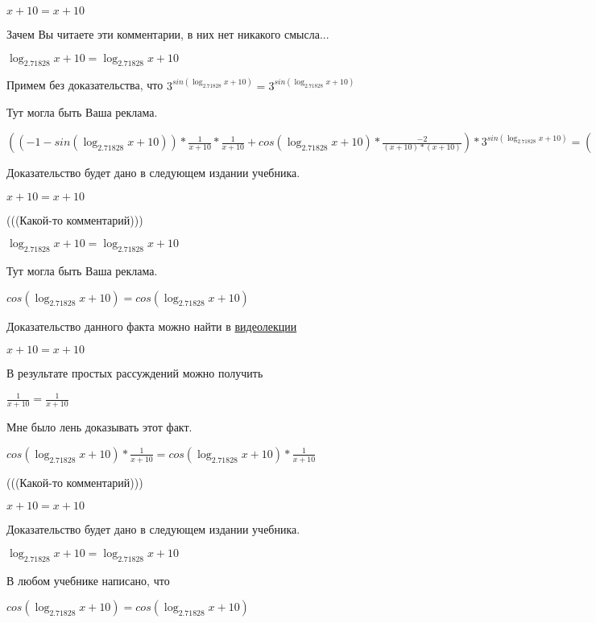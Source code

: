 \documentclass[12pt,a4paper,fleqn]{article}
\theoremstyle{definition}
\begin{document}
$ x  +  10  =  x  +  10 $

Зачем Вы читаете эти комментарии, в них нет никакого смысла...

$\log_{ 2.71828 }{ x  +  10 } = \log_{ 2.71828 }{ x  +  10 }$

Примем без доказательства, что
${ 3 }^{sin(\log_{ 2.71828 }{ x  +  10 })} = { 3 }^{sin(\log_{ 2.71828 }{ x  +  10 })}$

Тут могла быть Ваша реклама.

$(( -1  - sin(\log_{ 2.71828 }{ x  +  10 })) * \frac{ 1 }{ x  +  10 }
 * \frac{ 1 }{ x  +  10 }
 + cos(\log_{ 2.71828 }{ x  +  10 }) * \frac{ -2 }{( x  +  10 ) * ( x  +  10 )}
) * { 3 }^{sin(\log_{ 2.71828 }{ x  +  10 })} = (( -1  - sin(\log_{ 2.71828 }{ x  +  10 })) * \frac{ 1 }{ x  +  10 }
 * \frac{ 1 }{ x  +  10 }
 + cos(\log_{ 2.71828 }{ x  +  10 }) * \frac{ -2 }{( x  +  10 ) * ( x  +  10 )}
) * { 3 }^{sin(\log_{ 2.71828 }{ x  +  10 })}$

Доказательство будет дано в следующем издании учебника.

$ x  +  10  =  x  +  10 $

(((Какой-то комментарий)))

$\log_{ 2.71828 }{ x  +  10 } = \log_{ 2.71828 }{ x  +  10 }$

Тут могла быть Ваша реклама.

$cos(\log_{ 2.71828 }{ x  +  10 }) = cos(\log_{ 2.71828 }{ x  +  10 })$

Доказательство данного факта можно найти в \href{https://www.youtube.com/watch?v=dQw4w9WgXcQ}{видеолекции}

$ x  +  10  =  x  +  10 $

В результате простых рассуждений можно получить

$\frac{ 1 }{ x  +  10 }
 = \frac{ 1 }{ x  +  10 }
$

Мне было лень доказывать этот факт.

$cos(\log_{ 2.71828 }{ x  +  10 }) * \frac{ 1 }{ x  +  10 }
 = cos(\log_{ 2.71828 }{ x  +  10 }) * \frac{ 1 }{ x  +  10 }
$

(((Какой-то комментарий)))

$ x  +  10  =  x  +  10 $

Доказательство будет дано в следующем издании учебника.

$\log_{ 2.71828 }{ x  +  10 } = \log_{ 2.71828 }{ x  +  10 }$

В любом учебнике написано, что

$cos(\log_{ 2.71828 }{ x  +  10 }) = cos(\log_{ 2.71828 }{ x  +  10 })$
\end{document}
